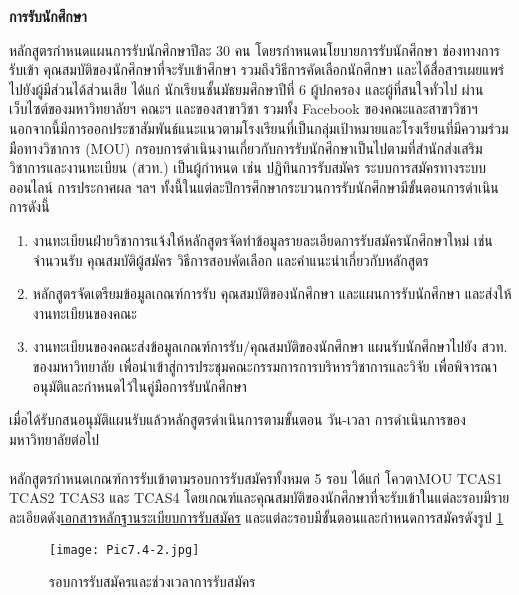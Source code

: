 \newpage
{}

\noindent
{\bf การรับนักศึกษา}

	หลักสูตรกำหนดแผนการรับนักศึกษาปีละ 30 คน โดยรกำหนดนโยบายการรับนักศึกษา ช่องทางการรับเข้า คุณสมบัติของนักศึกษาที่จะรับเข้าศึกษา รวมถึงวิธีการคัดเลือกนักศึกษา และได้สื่อสารเผยแพร่ไปยังผู้มีส่วนได้ส่วนเสีย ได้แก่ นักเรียนชั้นมัธยมศึกษาปีที่ 6 ผู้ปกครอง และผู้ที่สนใจทั่วไป ผ่านเว็บไซต์ของมหาวิทยาลัยฯ คณะฯ และของสาขาวิชา รวมทั้ง Facebook ของคณะและสาขาวิชาฯ นอกจากนี้มีการออกประชาสัมพันธ์แนะแนวตามโรงเรียนที่เป็นกลุ่มเป้าหมายและโรงเรียนที่มีความร่วมมือทางวิชาการ (MOU)   กรอบการดำเนินงานเกี่ยวกับการรับนักศึกษาเป็นไปตามที่สำนักส่งเสริมวิชาการและงานทะเบียน (สวท.) เป็นผู้กำหนด เช่น ปฏิทินการรับสมัคร ระบบการสมัครทางระบบออนไลน์ การประกาศผล ฯลฯ ทั้งนี้ในแต่ละปีการศึกษากระบวนการรับนักศึกษามีขั้นตอนการดำเนินการดังนี้
	\begin{enumerate}
		\item งานทะเบียนฝ่ายวิชาการแจ้งให้หลักสูตรจัดทำข้อมูลรายละเอียดการรับสมัครนักศึกษาใหม่ เช่น จำนวนรับ คุณสมบัติผู้สมัคร วิธีการสอบคัดเลือก และคำแนะนำเกี่ยวกับหลักสูตร
		\item หลักสูตรจัดเตรียมข้อมูลเกณฑ์การรับ คุณสมบัติของนักศึกษา และแผนการรับนักศึกษา และส่งให้งานทะเบียนของคณะ 
		\item งานทะเบียนของคณะส่งข้อมูลเกณฑ์การรับ/คุณสมบัติของนักศึกษา แผนรับนักศึกษาไปยัง สวท. ของมหาวิทยาลัย เพื่อนำเข้าสู่การประชุมคณะกรรมการการบริหารวิชาการและวิจัย เพื่อพิจารณาอนุมัติและกำหนดไว้ในคู่มือการรับนักศึกษา
	\end{enumerate}
เมื่อได้รับกสนอนุมัติแผนรับแล้วหลักสูตรดำเนินการตามขั้นตอน วัน-เวลา การดำเนินการของมหาวิทยาลัยต่อไป\\

\\[0.5cm]
หลักสูตรกำหนดเกณฑ์การรับเข้าตามรอบการรับสมัครทั้งหมด 5 รอบ ได้แก่ โควตาMOU TCAS1 TCAS2 TCAS3 และ TCAS4
โดยเกณฑ์และคุณสมบัติของนักศึกษาที่จะรับเข้าในแต่ละรอบมีรายละเอียดดัง\underline{เอกสารหลักฐานระเบียบการรับสมัคร}
และแต่ละรอบมีขั้นตอนและกำหนดการสมัครดังรูป
\ref{Pic6.1-01}\\
\begin{figure}[h!]
	\begin{center}
		\texttt{[image: Pic7.4-2.jpg]}
		\end{center}
	\caption{รอบการรับสมัครและช่วงเวลาการรับสมัคร}
	\label{Pic6.1-01}
\end{figure}\\

